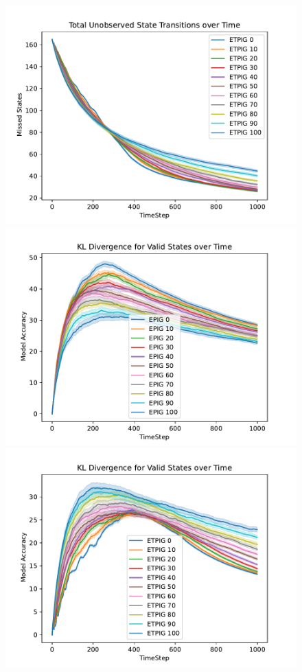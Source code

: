 \documentclass[12pt]{thesis}
\begin{document}
\begin{figure}[p]
	\includegraphics[scale=0.5]{"images/Epsilon_Missed_States_ETPIG.pdf"}
	\includegraphics[scale=0.5]{"images/Epsilon_Model_Accuracy_EPIG.pdf"}
	\includegraphics[scale=0.5]{"images/Epsilon_Model_Accuracy_ETPIG.pdf"}
\end{figure}
\end{document}
